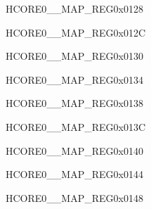 \begin{register}{H}{CORE0\_\_MAP\_REG}{0x0128}\label{regdesc:CORE0GPIOINT0MAPREG}
\end{register}\vspace{-3em}


\begin{register}{H}{CORE0\_\_MAP\_REG}{0x012C}\label{regdesc:CORE0GPIOINT1MAPREG}
\end{register}\vspace{-3em}


\begin{register}{H}{CORE0\_\_MAP\_REG}{0x0130}\label{regdesc:CORE0GPIOINT2MAPREG}
\end{register}\vspace{-3em}


\begin{register}{H}{CORE0\_\_MAP\_REG}{0x0134}\label{regdesc:CORE0GPIOINT3MAPREG}
\end{register}\vspace{-3em}


\begin{register}{H}{CORE0\_\_MAP\_REG}{0x0138}\label{regdesc:CORE0GPIOPADCOMPINTMAPREG}
\end{register}\vspace{-3em}


\begin{register}{H}{CORE0\_\_MAP\_REG}{0x013C}\label{regdesc:CORE0CPUINTFROMCPU0MAPREG}
\end{register}\vspace{-3em}


\begin{register}{H}{CORE0\_\_MAP\_REG}{0x0140}\label{regdesc:CORE0CPUINTFROMCPU1MAPREG}
\end{register}\vspace{-3em}


\begin{register}{H}{CORE0\_\_MAP\_REG}{0x0144}\label{regdesc:CORE0CPUINTFROMCPU2MAPREG}
\end{register}\vspace{-3em}


\begin{register}{H}{CORE0\_\_MAP\_REG}{0x0148}\label{regdesc:CORE0CPUINTFROMCPU3MAPREG}
\end{register}\vspace{-3em}




